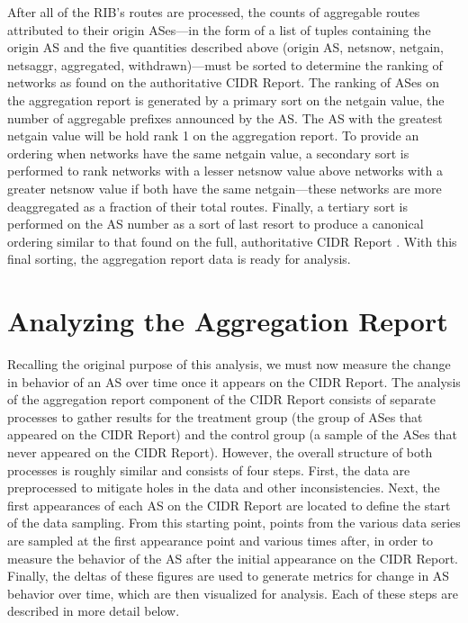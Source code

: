 After all of the RIB's routes are processed, the counts of aggregable routes
attributed to their origin ASes---in the form of a list of tuples containing
the origin AS and the five quantities described above (origin AS, netsnow,
netgain, netsaggr, aggregated, withdrawn)---must be sorted to determine the
ranking of networks as found on the authoritative CIDR Report. The ranking of
ASes on the aggregation report is generated by a primary sort on the netgain
value, the number of aggregable prefixes announced by the AS. The AS with the
greatest netgain value will be hold rank 1 on the aggregation report. To
provide an ordering when networks have the same netgain value, a secondary sort
is performed to rank networks with a lesser netsnow value above networks with a
greater netsnow value if both have the same netgain---these networks are more
deaggregated as a fraction of their total routes. Finally, a tertiary sort is
performed on the AS number as a sort of last resort to produce a canonical
ordering similar to that found on the full, authoritative CIDR Report
\cite{cidr-report-full}. With this final sorting, the aggregation report data
is ready for analysis.

\section{Analyzing the Aggregation Report}
\label{sec:method_agg_report_analysis}

Recalling the original purpose of this analysis, we must now measure the change
in behavior of an AS over time once it appears on the CIDR Report. The analysis
of the aggregation report component of the CIDR Report consists of separate
processes to gather results for the treatment group (the group of ASes that
appeared on the CIDR Report) and the control group (a sample of the ASes that
never appeared on the CIDR Report). However, the overall structure of both
processes is roughly similar and consists of four steps. First, the data are
preprocessed to mitigate holes in the data and other inconsistencies. Next, the
first appearances of each AS on the CIDR Report are located to define the start
of the data sampling. From this starting point, points from the various data
series are sampled at the first appearance point and various times after, in
order to measure the behavior of the AS after the initial appearance on the
CIDR Report. Finally, the deltas of these figures are used to generate metrics
for change in AS behavior over time, which are then visualized for analysis.
Each of these steps are described in more detail below.

